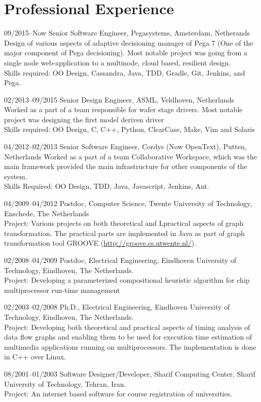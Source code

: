 \section{Professional Experience}

\begin{CV}
\item[09/2015--Now] Senior Software Engineer, Pegasystems, Amsterdam, Netherands
Design of various aspects of adaptive decisioning manager of Pega 7 (One of the major component of Pega decisioning). Most notable project was going from a single node web-application to a multinode, cloud based, resilient design. \\
Skills required: OO Design, Cassandra, Java, TDD, Gradle, Git, Jenkins, and Pega.

\item[02/2013--09/2015] Senior Design Engineer, ASML, Veldhoven, Netherlands
Worked as a part of a team responsible for wafer stage drivers. Most notable project was designing the first model deriven driver \\
Skills required: OO Design, C, C++, Python, ClearCase, Make, Vim and Solaris

\item[04/2012--02/2013] Senior Software Engineer, Cordys (Now OpenText), Putten, Netherlands
Worked as a part of a team Collaborative Workspace, which was the main framework provided the main infrastructure for other components of the system. \\
Skills Required: OO Design, TDD, Java, Javascript, Jenkins, Ant.

\item[04/2009--04/2012]Postdoc, Computer Science, Twente University of
Technology, Enschede, The Netherlands \\
\ifindustry
Project: Various projects on both theoretical and Lpractical aspects of graph transformation. The practical
parts are implemented in Java as part of graph transformation tool GROOVE (\url{http://groove.cs.utwente.nl/}).
\fi

\item[02/2008--04/2009] Postdoc, Electrical Engineering, Eindhoven University
of Technology, Eindhoven, The Netherlands. \\
\ifindustry
Project: Developing a parameterized compositional heuristic algorithm for chip multiprocessor run-time management 
\fi

\item[02/2003--02/2008] Ph.D., Electrical Engineering, Eindhoven
University of Technology, Eindhoven, The Netherlands.\\
\ifindustry
Project: Developing both theoretical and practical aspects of timing analysis of data flow graphs
and enabling them to be used for execution time estimation of multimedia applications running on multiprocessors.
The implementation is done in C++ over Linux.
\fi

\item[08/2001--01/2003] Software Designer/Developer, Sharif Computing Center, Sharif University of Technology, Tehran,
Iran.\\
\ifindustry
Project: An internet based software for course registration of
universities.
\fi
\end{CV}
